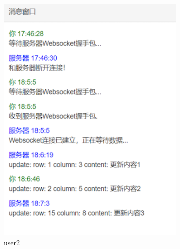 \documentclass[UTF8]{ctexart}
\begin{document}
\begin{figure}[h]
\begin{subfigure}[b]{0.3\textwidth}
		\includegraphics[width=\textwidth]{be4.png}
		\caption{user2}
	\end{subfigure}
	\begin{subfigure}[b]{0.3\textwidth}

\end{subfigure}
\end{figure}
\end{document}
